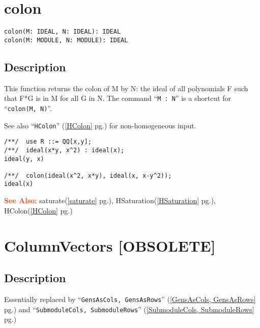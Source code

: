 \documentclass[a4paper]{mybook}
\newenvironment{command}{}{} %
\newcommand\SeeAlso{\par\textcolor{OrangeRed}{\textbf{\large See Also: }}}
\begin{document}
\section{colon}
\label{colon}
\begin{command} %


\begin{Verbatim}[label=syntax, rulecolor=\color{MidnightBlue},
frame=single]
colon(M: IDEAL, N: IDEAL): IDEAL
colon(M: MODULE, N: MODULE): IDEAL
\end{Verbatim}


\subsection*{Description}

This function returns the colon of M by N: the ideal of all
polynomials F such that F*G is in M for all G in N.
The command ``\verb&M : N&'' is a shortcut for ``\verb&colon(M, N)&''.
\par 
See also  ``\verb&HColon&'' (\ref{HColon} pg.\pageref{HColon}) for non-homogeneous input.
\begin{Verbatim}[label=example, rulecolor=\color{PineGreen}, frame=single]
/**/  use R ::= QQ[x,y];
/**/  ideal(x*y, x^2) : ideal(x);
ideal(y, x)

/**/  colon(ideal(x^2, x*y), ideal(x, x-y^2));
ideal(x)
\end{Verbatim}


\SeeAlso %
  saturate(\ref{saturate} pg.\pageref{saturate}), 
    HSaturation(\ref{HSaturation} pg.\pageref{HSaturation}), 
    HColon(\ref{HColon} pg.\pageref{HColon})
\end{command} %

\section{ColumnVectors [OBSOLETE]}
\label{ColumnVectors [OBSOLETE]}
\begin{command} %



\subsection*{Description}

Essentially replaced by ``\verb&GensAsCols, GensAsRows&'' (\ref{GensAsCols, GensAsRows} pg.\pageref{GensAsCols, GensAsRows})
and ``\verb&SubmoduleCols, SubmoduleRows&'' (\ref{SubmoduleCols, SubmoduleRows} pg.\pageref{SubmoduleCols, SubmoduleRows})

\end{command} %
\end{document}
